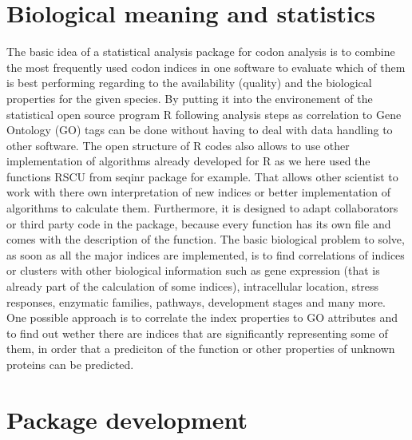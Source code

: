 \section{Biological meaning and statistics}
The basic idea of a statistical analysis package for codon analysis is to combine the most frequently used codon indices in one software to evaluate which of them is best performing regarding to the availability (quality) and the biological properties for the given species. By putting it into the environement of the statistical open source program R following analysis steps as correlation to Gene Ontology (GO) tags can be done without having to deal with data handling to other software. The open structure of R codes also allows to use other implementation of algorithms already developed for R as we here used the functions RSCU from seqinr package for example. That allows other scientist to work with there own interpretation of new indices or better implementation of algorithms to calculate them. Furthermore, it is designed to adapt collaborators or third party code in the package, because every function has its own file and comes with the description of the function.
The basic biological problem to solve, as soon as all the major indices are implemented, is to find correlations of indices or clusters with other biological information such as gene expression (that is already part of the calculation of some indices), intracellular location, stress responses, enzymatic families, pathways, development stages and many more. One possible approach is to correlate the index properties to GO attributes and to find out wether there are indices that are significantly representing some of them, in order that a prediciton of the function or other properties of unknown proteins can be predicted.

\section{Package development}
